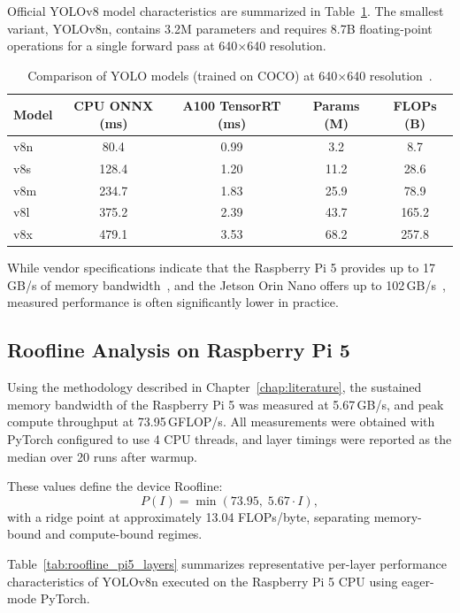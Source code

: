 \documentclass[12pt,a4paper]{report}
\begin{document}
Official YOLOv8 model characteristics are summarized in Table~\ref{tab:yolov8_models}.
The smallest variant, YOLOv8n, contains 3.2M parameters and requires 8.7B floating-point operations
for a single forward pass at 640$\times$640 resolution.

\begin{table}[ht]
\centering
\caption{Comparison of YOLO models (trained on COCO) at 640$\times$640 resolution~\cite{ultralytics_yolov8_performance}.}
\label{tab:yolov8_models}
\begin{tabular}{lcccc}
\toprule
Model &
CPU ONNX (ms) & A100 TensorRT (ms) & Params (M) & FLOPs (B) \\
\midrule
v8n & 80.4  & 0.99 & 3.2  & 8.7   \\
v8s & 128.4 & 1.20 & 11.2 & 28.6  \\
v8m & 234.7 & 1.83 & 25.9 & 78.9  \\
v8l & 375.2 & 2.39 & 43.7 & 165.2 \\
v8x & 479.1 & 3.53 & 68.2 & 257.8 \\
\bottomrule
\end{tabular}
\end{table}

While vendor specifications indicate that the Raspberry Pi 5 provides up to 17\,GB/s of memory bandwidth~\cite{raspberrypi_processors},
and the Jetson Orin Nano offers up to 102\,GB/s~\cite{nvidia_jetson_orin_datasheet},
measured performance is often significantly lower in practice.

\subsection{Roofline Analysis on Raspberry Pi 5}

Using the methodology described in Chapter~\ref{chap:literature}, the sustained memory bandwidth of the Raspberry Pi 5
was measured at 5.67\,GB/s, and peak compute throughput at 73.95\,GFLOP/s.
All measurements were obtained with PyTorch configured to use 4 CPU threads, and layer timings
were reported as the median over 20 runs after warmup.

\noindent These values define the device Roofline:
\[
P(I) = \min\left(73.95,\; 5.67 \cdot I\right),
\]
with a ridge point at approximately 13.04 FLOPs/byte, separating memory-bound and compute-bound regimes.

Table~\ref{tab:roofline_pi5_layers} summarizes representative per-layer performance characteristics
of YOLOv8n executed on the Raspberry Pi 5 CPU using eager-mode PyTorch.
\end{document}
